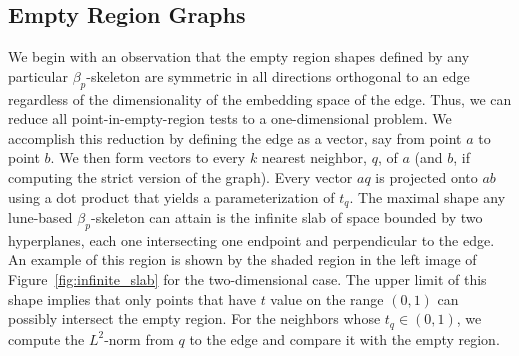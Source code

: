 \subsection{Empty Region Graphs}
We begin with an observation that the empty region shapes defined by any particular $\beta_p$-skeleton are symmetric in all directions orthogonal to an edge regardless of the dimensionality of the embedding space of the edge.
%
Thus, we can reduce all point-in-empty-region tests to a one-dimensional problem.
%
We accomplish this reduction by defining the edge as a vector, say from point $a$ to point $b$.
%
We then form vectors to every $k$ nearest neighbor, $q$, of $a$ (and $b$, if computing the strict version of the graph).
%
Every vector $aq$ is projected onto $ab$ using a dot product that yields a parameterization of $t_q$.
%
The maximal shape any lune-based $\beta_p$-skeleton can attain is the infinite slab of space bounded by two hyperplanes, each one intersecting one endpoint and perpendicular to the edge.
%
An example of this region is shown by the shaded region in the left image of Figure~\ref{fig:infinite_slab} for the two-dimensional case.
%
The upper limit of this shape implies that only points that have $t$ value on the range $(0,1)$ can possibly intersect the empty region.
%
For the neighbors whose $t_q \in (0,1)$, we compute the $L^2$-norm from $q$ to the edge and compare it with the empty region.

